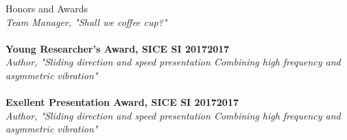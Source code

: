 \documentclass{resume} %
\begin{document}
\begin{rSection}{Honors and Awards}
\\{\em Team Manager, "Shall we coffee cup?"} \\
\vspace{-3mm}
\\{\bf Young Researcher's Award, SICE SI 2017}\hfill {\bf 2017}
\\{\em Author, "Sliding direction and speed presentation Combining high frequency and asymmetric vibration"} \\
\vspace{-3mm}
\\{\bf Exellent Presentation Award, SICE SI 2017}\hfill {\bf 2017}
\\{\em Author, "Sliding direction and speed presentation
Combining high frequency and asymmetric vibration"} \\
\vspace{-3mm}


\end{rSection}
\end{document}
